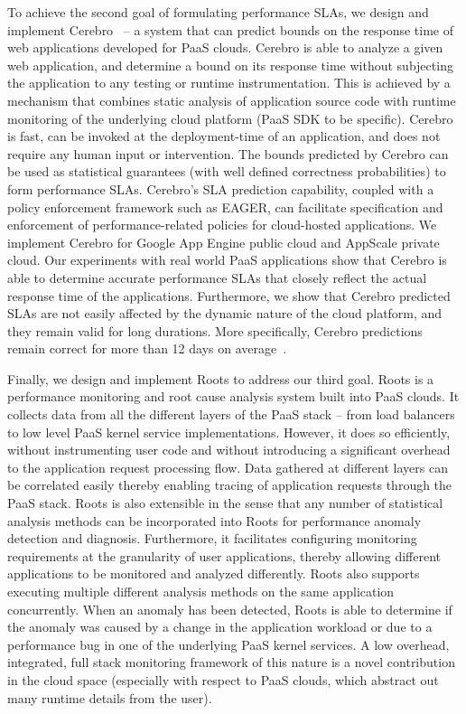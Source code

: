 To achieve the second goal of formulating performance SLAs, we design and implement 
Cerebro~\cite{Jayathilaka:2015:RTS:2806777.2806842} --
a system that can predict bounds on the response time of web applications developed for PaaS clouds.
Cerebro is able to analyze a given web application, and determine a bound on its response time without
subjecting the application to any testing or runtime instrumentation. This is achieved by a mechanism
that combines static analysis of application source code with runtime monitoring of the underlying
cloud platform (PaaS SDK to be specific). Cerebro is fast, can be invoked at the deployment-time 
of an application, and does not require any human input or intervention. 
The bounds predicted by Cerebro can be used as statistical guarantees (with well defined correctness
probabilities) to form performance SLAs. Cerebro's SLA prediction capability, coupled with a policy
enforcement framework such as EAGER, can facilitate specification and enforcement of performance-related
policies for cloud-hosted applications. We implement Cerebro for Google App Engine public cloud
and AppScale private cloud. Our experiments with real world PaaS applications show that Cerebro
is able to determine accurate performance SLAs that closely reflect the actual response time
of the applications. Furthermore, we show that Cerebro predicted SLAs are not easily affected by
the dynamic nature of the cloud platform, and they remain valid for long durations. More specifically, 
Cerebro predictions remain correct for more than 12 days on average~\cite{7396174}. 

Finally, we design and implement Roots to address our third goal. Roots is a performance monitoring and root
cause analysis system built into PaaS clouds. It collects data from all the different layers of the
PaaS stack -- from load balancers to low level PaaS kernel service implementations. However,
it does so efficiently, without instrumenting user code and without introducing a significant
overhead to the application request processing flow. Data gathered at different layers can
be correlated easily thereby enabling tracing of application requests through the PaaS stack.
Roots is also extensible in the sense that 
any number of statistical analysis methods can be incorporated into Roots for performance
anomaly detection and diagnosis. Furthermore, it facilitates configuring monitoring requirements
at the granularity of user applications, thereby allowing different applications to be monitored
and analyzed differently. Roots also supports executing multiple different analysis methods on the same
application concurrently. When an anomaly has been detected, Roots is able to determine if
the anomaly was caused by a change in the application workload or due to a performance 
bug in one of the underlying PaaS kernel services. A low overhead, integrated, full stack monitoring
framework of this nature is a novel contribution in the cloud space (especially with respect
to PaaS clouds, which abstract out many runtime details from the user). 

